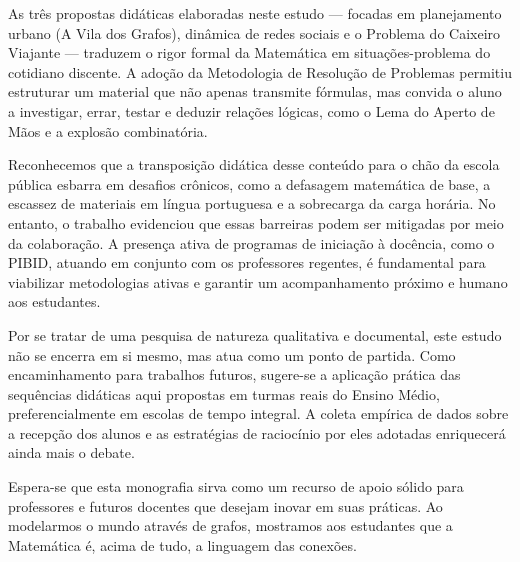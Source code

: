 \documentclass[
  12pt,
  oneside,
  a4paper,
  english,
  brazilian
  ]{abntex2}
\theoremstyle{definition}
\begin{document}
As três propostas didáticas elaboradas neste estudo --- focadas em planejamento urbano (A Vila dos Grafos), dinâmica de redes sociais e o Problema do Caixeiro Viajante --- traduzem o rigor formal da Matemática em situações-problema do cotidiano discente. A adoção da Metodologia de Resolução de Problemas permitiu estruturar um material que não apenas transmite fórmulas, mas convida o aluno a investigar, errar, testar e deduzir relações lógicas, como o Lema do Aperto de Mãos e a explosão combinatória.

Reconhecemos que a transposição didática desse conteúdo para o chão da escola pública esbarra em desafios crônicos, como a defasagem matemática de base, a escassez de materiais em língua portuguesa e a sobrecarga da carga horária. No entanto, o trabalho evidenciou que essas barreiras podem ser mitigadas por meio da colaboração. A presença ativa de programas de iniciação à docência, como o PIBID, atuando em conjunto com os professores regentes, é fundamental para viabilizar metodologias ativas e garantir um acompanhamento próximo e humano aos estudantes.

Por se tratar de uma pesquisa de natureza qualitativa e documental, este estudo não se encerra em si mesmo, mas atua como um ponto de partida. Como encaminhamento para trabalhos futuros, sugere-se a aplicação prática das sequências didáticas aqui propostas em turmas reais do Ensino Médio, preferencialmente em escolas de tempo integral. A coleta empírica de dados sobre a recepção dos alunos e as estratégias de raciocínio por eles adotadas enriquecerá ainda mais o debate.

Espera-se que esta monografia sirva como um recurso de apoio sólido para professores e futuros docentes que desejam inovar em suas práticas. Ao modelarmos o mundo através de grafos, mostramos aos estudantes que a Matemática é, acima de tudo, a linguagem das conexões.

\postextual

\printbibliography
\end{document}
